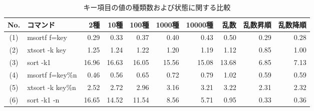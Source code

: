 \begin{table}[hbt]
\begin{center}
\caption{キー項目の値の種類数および状態に関する比較}
\begin{tabular}{clrrrrrrrr}
\hline
No. & コマンド & 2種 & 10種 & 100種 & 1000種 & 10000種 & 乱数 & 乱数昇順 & 乱数降順 \\
\hline
(1)&msortf f=key&0.29&0.33&0.37&0.40&0.43&0.50&0.29&0.28 \\
(2)&xtsort -k key&1.25&1.24&1.22&1.20&1.19&1.12&0.85&1.00 \\
(3)&sort -k1&16.96&16.63&16.05&15.56&15.08&13.68&6.85&7.13 \\
\hline
(4)&msortf f=key\%n&0.46&0.56&0.65&0.72&0.79&1.02&0.59&0.59 \\
(5)&xtsort -k key\%n&2.52&2.72&2.96&3.16&3.21&3.22&2.31&2.32 \\
(6)&sort -k1 -n&16.65&14.52&11.54&8.56&5.71&0.95&0.33&0.36 \\
\hline
\end{tabular}
\end{center}
\end{table}
